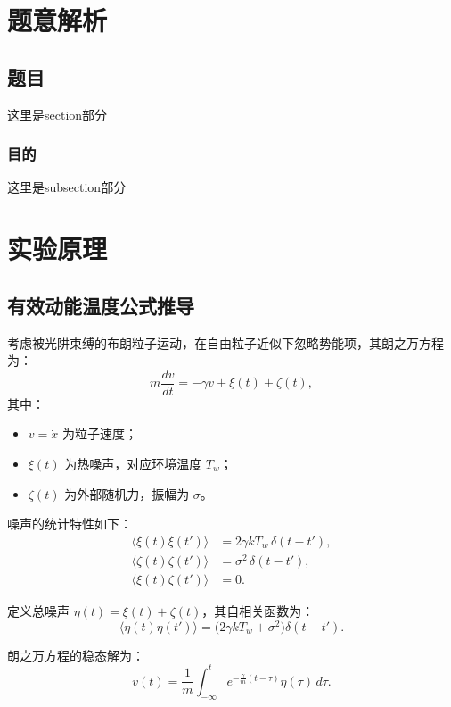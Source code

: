 \documentclass[a4paper,draft]{report} %
\begin{document}
\chapter{题意解析}
\section{题目}
这里是section部分
\subsection{目的}
这里是subsection部分

\chapter{实验原理}
\section{有效动能温度公式推导}

考虑被光阱束缚的布朗粒子运动，在自由粒子近似下忽略势能项，其朗之万方程为：
\begin{equation}
m \frac{dv}{dt} = -\gamma v + \xi(t) + \zeta(t),
\end{equation}
其中：
\begin{itemize}
    \item $v = \dot{x}$ 为粒子速度；
    \item $\xi(t)$ 为热噪声，对应环境温度 $T_w$；
    \item $\zeta(t)$ 为外部随机力，振幅为 $\sigma$。
\end{itemize}

噪声的统计特性如下：
\begin{align}
\langle \xi(t) \xi(t') \rangle &= 2\gamma k T_w \,\delta(t - t'), \\
\langle \zeta(t) \zeta(t') \rangle &= \sigma^2 \,\delta(t - t'), \\
\langle \xi(t) \zeta(t') \rangle &= 0.
\end{align}

定义总噪声 $\eta(t) = \xi(t) + \zeta(t)$，其自相关函数为：
\begin{equation}
\langle \eta(t) \eta(t') \rangle = \big( 2\gamma k T_w + \sigma^2 \big) \delta(t - t').
\end{equation}

朗之万方程的稳态解为：
\begin{equation}
v(t) = \frac{1}{m} \int_{-\infty}^{t} e^{-\frac{\gamma}{m}(t-\tau)} \eta(\tau) \, d\tau.
\end{equation}
\end{document}
